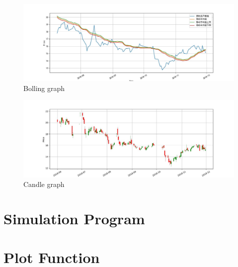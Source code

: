 \begin{figure}[H]
    \centering
    \includegraphics[width=\textwidth]{figures/2019-11-13-black-scholes-4}
    \caption{Bolling graph}\label{F:black-scholes-4}
\end{figure}

\begin{figure}[H]
    \centering
    \includegraphics[width=\textwidth]{figures/2019-11-13-black-scholes-5}
    \caption{Candle graph}\label{F:black-scholes-5}
\end{figure}



\appendix
    \section{Simulation Program}
    \section{Plot Function}
